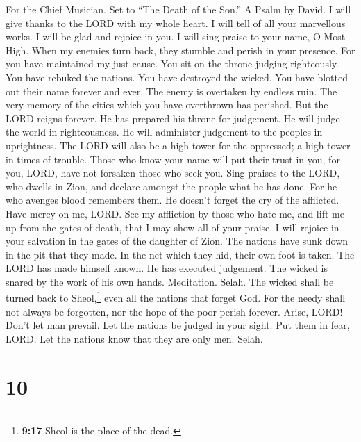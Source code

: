 For the Chief Musician. Set to ``The Death of the Son.'' A Psalm by
David.  I will give thanks to the LORD with my whole
heart. I will tell of all your marvellous works.  I will
be glad and rejoice in you. I will sing praise to your name, O Most
High.  When my enemies turn back, they stumble and perish
in your presence.  For you have maintained my just cause.
You sit on the throne judging righteously.  You have
rebuked the nations. You have destroyed the wicked. You have blotted out
their name forever and ever.  The enemy is overtaken by
endless ruin. The very memory of the cities which you have overthrown
has perished.  But the LORD reigns forever. He has
prepared his throne for judgement.  He will judge the
world in righteousness. He will administer judgement to the peoples in
uprightness.  The LORD will also be a high tower for the
oppressed; a high tower in times of trouble.  Those who
know your name will put their trust in you, for you, LORD, have not
forsaken those who seek you.  Sing praises to the LORD,
who dwells in Zion, and declare amongst the people what he has done.
 For he who avenges blood remembers them. He doesn't
forget the cry of the afflicted.  Have mercy on me, LORD.
See my affliction by those who hate me, and lift me up from the gates of
death,  that I may show all of your praise. I will
rejoice in your salvation in the gates of the daughter of Zion.
 The nations have sunk down in the pit that they made. In
the net which they hid, their own foot is taken.  The
LORD has made himself known. He has executed judgement. The wicked is
snared by the work of his own hands. Meditation. Selah. 
The wicked shall be turned back to Sheol,\footnote{\textbf{9:17} Sheol
  is the place of the dead.} even all the nations that forget God.
 For the needy shall not always be forgotten, nor the
hope of the poor perish forever.  Arise, LORD! Don't let
man prevail. Let the nations be judged in your sight. 
Put them in fear, LORD. Let the nations know that they are only men.
Selah.

\hypertarget{section-9}{%
\section{10}\label{section-9}}

